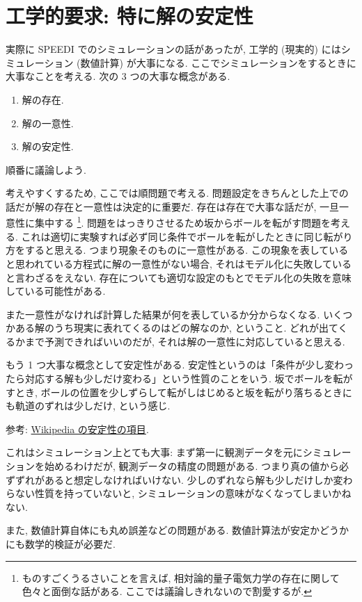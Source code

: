 \documentclass[openany, a4paper, oneside]{jsbook}
\begin{document}
\section{工学的要求: 特に解の安定性}

実際に SPEEDI でのシミュレーションの話があったが, 工学的 (現実的) にはシミュレーション (数値計算) が大事になる.
ここでシミュレーションをするときに大事なことを考える.
次の 3 つの大事な概念がある.
\begin{enumerate}
\item 解の存在.
\item 解の一意性.
\item 解の安定性.
\end{enumerate}
順番に議論しよう.

考えやすくするため, ここでは順問題で考える.
問題設定をきちんとした上での話だが解の存在と一意性は決定的に重要だ.
存在は存在で大事な話だが, 一旦一意性に集中する \footnote{ものすごくうるさいことを言えば, 相対論的量子電気力学の存在に関して色々と面倒な話がある. ここでは議論しきれないので割愛するが.}.
問題をはっきりさせるため坂からボールを転がす問題を考える.
これは適切に実験すれば必ず同じ条件でボールを転がしたときに同じ転がり方をすると思える.
つまり現象そのものに一意性がある.
この現象を表していると思われている方程式に解の一意性がない場合,
それはモデル化に失敗していると言わざるをえない.
存在についても適切な設定のもとでモデル化の失敗を意味している可能性がある.

また一意性がなければ計算した結果が何を表しているか分からなくなる.
いくつかある解のうち現実に表れてくるのはどの解なのか, ということ.
どれが出てくるかまで予測できればいいのだが, それは解の一意性に対応していると思える.

もう 1 つ大事な概念として安定性がある.
安定性というのは「条件が少し変わったら対応する解も少しだけ変わる」という性質のことをいう.
坂でボールを転がすとき,
ボールの位置を少しずらして転がしはじめると坂を転がり落ちるときにも軌道のずれは少しだけ, という感じ.

参考: \href{http://ja.wikipedia.org/wiki/\%E5\%AE\%89\%E5\%AE\%9A\%E6\%80\%A7\%E7\%90\%86\%E8\%AB\%96}{Wikipedia の安定性の項目}.

これはシミュレーション上とても大事:
まず第一に観測データを元にシミュレーションを始めるわけだが,
観測データの精度の問題がある.
つまり真の値から必ずずれがあると想定しなければいけない.
少しのずれなら解も少しだけしか変わらない性質を持っていないと,
シミュレーションの意味がなくなってしまいかねない.

また, 数値計算自体にも丸め誤差などの問題がある.
数値計算法が安定かどうかにも数学的検証が必要だ.
\end{document}
